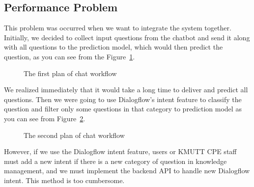 \documentclass[12pt,oneside,openright,a4paper]{cpe-english-project}
\begin{document}
\subsection{Performance Problem}
This problem was occurred when we want to integrate the system together. Initially, we decided to
collect input questions from the chatbot and send it along with all questions to the prediction model,
which would then predict the question, as you can see from the Figure~\ref*{fig:chat_plan_1}.

\begin{figure}[!h]\centering
{}
\caption{The first plan of chat workflow}
\label{fig:chat_plan_1}
\end{figure}

We realized immediately that it would take a long time to deliver and predict all questions.
Then we were going to use Dialogflow's intent feature to classify the question and filter
only some questions in that category to prediction model as you can see from
Figure~\ref*{fig:chat_plan_2}.

\begin{figure}[!h]\centering
{}
\caption{The second plan of chat workflow}
\label{fig:chat_plan_2}
\end{figure}

However, if we use the Dialogflow intent feature, users or KMUTT CPE staff must add a new intent
if there is a new category of question in knowledge management, and we must implement the backend
API to handle new Dialogflow intent. This method is too cumbersome.
\end{document}
